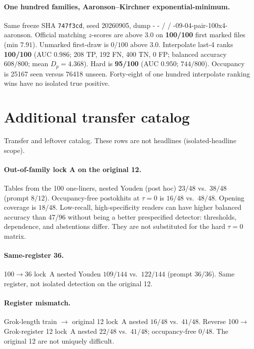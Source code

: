 \documentclass[11pt,a4paper]{article}
\makeatletter
\newcommand{\ttfile}[1]{\bgroup\ttfamily\ttfile@scan#1\relax\egroup}
\def\ttfile@scan#1{%
  \ifx#1\relax
  \else
    \ifx#1-%
      -\penalty0 %
    \else
      \ifx#1/%
        /\penalty0 %
      \else
        #1%
      \fi
    \fi
    \expandafter\ttfile@scan
  \fi}
\theoremstyle{definition}
\makeatother
\begin{document}
\paragraph{One hundred families, Aaronson--Kirchner exponential-minimum.}
Same freeze SHA \texttt{747f3cd}, seed 20260905, dump
\ttfile{2026-09-04-pair-100x4-aaronson}. Official matching
$z$-scores are above $3.0$ on \textbf{100/100} first marked files
(min $7.91$). Unmarked first-draw is $0/100$ above $3.0$. Interpolate
last-4 ranks \textbf{100/100} (AUC $0.986$; 208 TP, 192 FN, 400 TN,
0 FP; balanced accuracy $608/800$; mean $D_p=4.368$). Hard is
\textbf{95/100} (AUC $0.950$; $744/800$). Occupancy is 25167 seen versus
76418 unseen. Forty-eight of one hundred interpolate ranking wins have
no isolated true positive.

\section{Additional transfer catalog}
\label{app:catalog}

Transfer and leftover catalog. These rows are not headlines
(isolated-headline scope).

\paragraph{Out-of-family lock A on the original 12.}
Tables from the 100 one-liners, nested Youden (post hoc)
$23/48$ vs.\ $38/48$ (prompt $8/12$). Occupancy-free postokhits at
$\tau=0$ is $16/48$ vs.\ $48/48$. Opening coverage is $18/48$.
Low-recall, high-specificity readers can have higher balanced accuracy
than 47/96 without being a better prespecified detector: thresholds,
dependence, and abstentions differ. They are not substituted for the
hard $\tau=0$ matrix.

\paragraph{Same-register 36.}
100$\to$36 lock~A nested Youden $109/144$ vs.\ $122/144$ (prompt
$36/36$). Same register, not isolated detection on the original 12.

\paragraph{Register mismatch.}
Grok-length train $\to$ original 12 lock~A nested $16/48$ vs.\ $41/48$.
Reverse 100$\to$Grok-register 12 lock~A nested $22/48$ vs.\ $41/48$;
occupancy-free $0/48$. The original 12 are not uniquely difficult.
\end{document}
